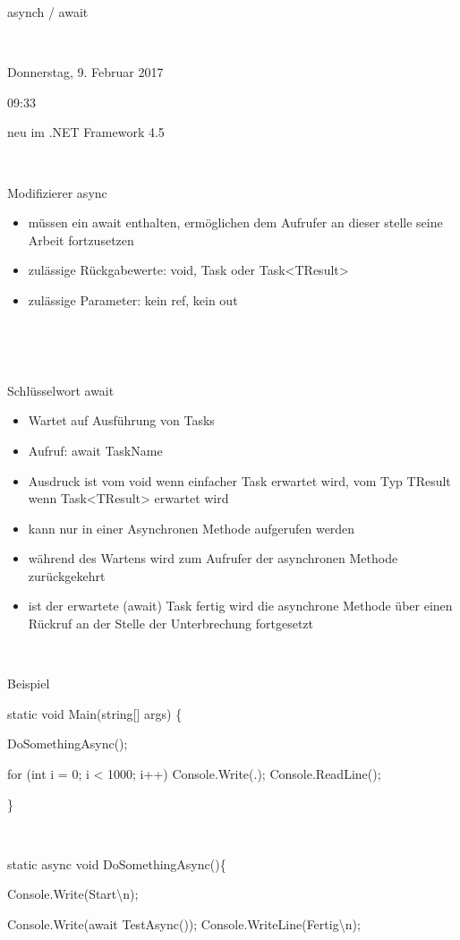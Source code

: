 asynch / await

~

Donnerstag, 9. Februar 2017

09:33

neu im .NET Framework 4.5

~

Modifizierer async

\begin{itemize}
\item müssen ein await enthalten, ermöglichen dem Aufrufer an dieser stelle seine Arbeit fortzusetzen
\item zulässige Rückgabewerte: void, Task oder Task{\textless}TResult{\textgreater}
\item zulässige Parameter: kein ref, kein out
\end{itemize}
~

~

Schlüsselwort await

\begin{itemize}
\item Wartet auf Ausführung von Tasks
\item Aufruf: await TaskName
\item Ausdruck ist vom void wenn einfacher Task erwartet wird, vom Typ TResult wenn Task{\textless}TResult{\textgreater} erwartet wird
\item kann nur in einer Asynchronen Methode aufgerufen werden
\item während des Wartens wird zum Aufrufer der asynchronen Methode zurückgekehrt
\item ist der erwartete (await) Task fertig wird die asynchrone Methode über einen Rückruf an der Stelle der Unterbrechung fortgesetzt
\end{itemize}
~

Beispiel

static void Main(string[] args) \{ 

DoSomethingAsync(); 

for (int i = 0; i {\textless} 1000; i++) Console.Write({\textquotedbl}.{\textquotedbl}); Console.ReadLine(); 

\} 

~

static async void DoSomethingAsync()\{ 

Console.Write({\textquotedbl}Start{\textbackslash}n{\textquotedbl}); 

Console.Write(await TestAsync()); Console.WriteLine({\textquotedbl}Fertig{\textbackslash}n{\textquotedbl}); 

